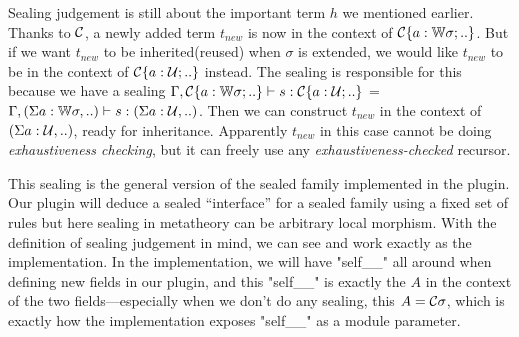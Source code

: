 Sealing judgement is still about the important term $h$ we mentioned earlier. Thanks to ${\mathcal{C}}$, a newly added term $t_{new}$ is now in the context of ${\mathcal{C}}\{a : {\mathbb{W}} \sigma; ..\}$. But if we want $t_{new}$ to be inherited(reused) when $\sigma$ is extended, we would like $t_{new}$ to be in the context  of ${\mathcal{C}}\{a : {\mathcal{U}}; ..\}$ instead. The sealing is responsible for this because we have a sealing ${ {\Gamma, {\mathcal{C}}\{a : {\mathbb{W}} \sigma; ..\}} \vdash {s} : {{\mathcal{C}}\{a : {\mathcal{U}}; ..\}} }$ = ${ {\Gamma, (\Sigma a : {\mathbb{W}} \sigma,..)} \vdash {s} : {(\Sigma a : {\mathcal{U}},..)} }$. Then we can construct $t_{new}$ in the context of  $(\Sigma a : {\mathcal{U}},..)$, ready for inheritance. Apparently $t_{new}$ in this case cannot be doing \textit{exhaustiveness checking}, but it can freely use any \textit{exhaustiveness-checked} recursor.  




This sealing is the general version of the sealed family implemented in the plugin. Our plugin will deduce a sealed ``interface'' for a sealed family using a fixed set of rules but here sealing in metatheory can be arbitrary local morphism. With the definition of sealing judgement in mind, we can see
 and  work exactly as the
implementation. In the implementation, we will have "self__" all around
when defining new fields in our plugin, and this "self__" is exactly the
$A$ in the context of the two fields---especially when we don't do any
sealing, this $A = {\mathcal{C}} \sigma$, which is exactly how the implementation
exposes "self__" as a module parameter. 

